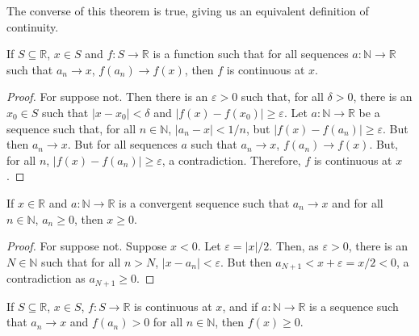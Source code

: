 \documentclass[crop=false,class=book,oneside]{standalone}
\begin{document}
            The converse of this theorem is true, giving us
            an equivalent definition of continuity.
            \begin{theorem}
                If $S\subseteq\mathbb{R}$, $x\in{S}$ and
                $f:S\rightarrow\mathbb{R}$
                is a function such that for all sequences
                $a:\mathbb{N}\rightarrow\mathbb{R}$ such that
                $a_{n}\rightarrow{x}$,
                $f(a_{n})\rightarrow{f(x)}$,
                then $f$ is continuous at $x$.
            \end{theorem}
            \begin{proof}
                For suppose not. Then there is an
                $\varepsilon>0$ such that, for all $\delta>0$,
                there is an $x_{0}\in{S}$ such that
                $|x-x_{0}|<\delta$ and
                $|f(x)-f(x_{0})|\geq\varepsilon$.
                Let $a:\mathbb{N}\rightarrow\mathbb{R}$
                be a sequence such that, for all
                $n\in\mathbb{N}$, $|a_{n}-x|<1/n$, but
                $|f(x)-f(a_{n})|\geq\varepsilon$.
                But then $a_{n}\rightarrow{x}$. But for all
                sequences $a$ such that $a_{n}\rightarrow{x}$,
                $f(a_{n})\rightarrow{f(x)}$. But, for all $n$,
                $|f(x)-f(a_{n})|\geq\varepsilon$,
                a contradiction.
                Therefore, $f$ is continuous at $x$.
            \end{proof}
            \begin{theorem}
                If $x\in\mathbb{R}$ and
                $a:\mathbb{N}\rightarrow\mathbb{R}$
                is a convergent sequence such that
                $a_{n}\rightarrow{x}$ and for all
                $n\in\mathbb{N}$, $a_{n}\geq{0}$,
                then $x\geq{0}$.
            \end{theorem}
            \begin{proof}
                For suppose not. Suppose $x<0$. Let
                $\varepsilon=|x|/2$. Then, as $\varepsilon>0$, there
                is an $N\in\mathbb{N}$ such that for all $n>N$,
                $|x-a_{n}|<\varepsilon$. But then
                $a_{N+1}<x+\varepsilon=x/2<0$, a contradiction as
                $a_{N+1}\geq{0}$.
            \end{proof}
            \begin{theorem}
                \label{thm:Funct:Continuous_Limit_%
                       of_Pos_Sequ_is_nonneg}
                If $S\subseteq\mathbb{R}$, $x\in{S}$,
                $f:S\rightarrow\mathbb{R}$ is continuous at $x$, and if
                $a:\mathbb{N}\rightarrow\mathbb{R}$ is a sequence such
                that  $a_{n}\rightarrow{x}$ and $f(a_{n})>0$
                for all $n\in\mathbb{N}$, then $f(x)\geq{0}$.
            \end{theorem}
\end{document}
